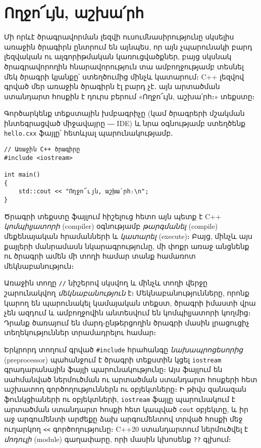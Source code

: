 \chapter{Ողջո՜ւյն, աշխա՛րհ}

Մի որևէ ծրագրավորման լեզվի ուսումնասիրությունը սկսելիս 
առաջին ծրագիրն ընտրում են այնպես, որ այն չպարունակի բարդ 
լեզվական ու ալգորիթմական կառուցվածքներ, բայց սկսնակ 
ծրագրավորողին հնարավորություն տա ամբողջությամբ տեսնել մեկ 
ծրագրի կյանքը՝ ստեղծումից մինչև կատարում։ C++ լեզվով գրված 
մեր առաջին ծրագիրն էլ բարդ չէ․ այն արտածման ստանդարտ հոսքին 
է դուրս բերում «Ողջո՜ւյն, աշխա՛րհ։» տեքստը։

Գործարկենք տեքստային խմբագրիչը (կամ ծրագրերի մշակման 
ինտեգրացված միջավայրը ― IDE) և նրա օգնությամբ ստեղծենք 
\texttt{hello.cxx} ֆայլը՝ հետևյալ պարունակությամբ․

\begin{Verbatim}
// Առաջին C++ ծրագիրը
#include <iostream>

int main()
{
    std::cout << "Ողջո՜ւյն, աշխա՛րհ։\n";
}
\end{Verbatim}

Ծրագրի տեքստը ֆայլում հիշելուց հետո այն պետք է C++ 
\emph{կոմպիլյատորի} (compiler) օգնությամբ \emph{թարգմանել}
(compile) մեքենայական հրամանների և \emph{կատարել} (execute)։ 
Բայց, մինչև այս քայլերի մանրամասն նկարագրությունը, մի փոքր 
առաջ անցնենք ու ծրագրի ամեն մի տողի համար տանք համառոտ 
մեկնաբանություն։

Առաջին տողը \verb|//| նիշերով սկսվող և մինչև տողի վերջը շարունակվող 
\emph{մեկնաբանություն} է։ Մեկնաբանությունները, որոնք կարող են 
պարունակել կամայական տեքստ, ծրագրի իմաստի վրա չեն ազդում և ամբողջովին 
անտեսվում են կոմպիլյատորի կողմից։ Դրանք ծառայում են մարդ-ընթերցողին 
ծրագրի մասին լրացուցիչ տեղեկություններ տրամադրելու համար։

Երկրորդ տողում գրված \verb|#include| հրահանգը \emph{նախապրոցեսորից} 
(preprocessor) պահանջում է ծրագրի տեքստին կցել \texttt{iostream} 
գրադարանային ֆայլի պարունակությունը։ Այս ֆայլում են սահմանված ներմուծման 
ու արտածման ստանդարտ հոսքերի հետ աշխատող գործողություններն ու օբյեկտները։ 
Ի թիվս զանազան ֆունկցիաների ու օբյեկտների, \texttt{iostream} ֆայլը 
պարունակում է արտածման ստանդարտ հոսքի հետ կապված \texttt{cout} օբյեկտը, 
և իր աջ արգումենտի արժեքը ձախ արգումենտով տրված հոսքի մեջ ուղարկող 
\verb|<<| գործողությունը։ C++20 ստանդարտում ներմուծվել է \emph{մոդուլի} 
(module) գաղափարը, որի մասին կխոսենք \verb|??| գլխում։

